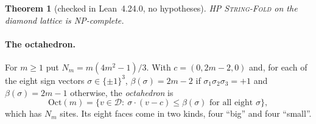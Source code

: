 \documentclass[11pt,letterpaper]{article}
\newtheorem{theorem}{Theorem}
\theoremstyle{definition}
\theoremstyle{remark}
\newcommand{\prob}[1]{\textup{\textsc{#1}}}
\begin{document}
\begin{theorem}[checked in Lean~4.24.0, no hypotheses]\label{thm:diamond}
\prob{HP String-Fold} on the diamond lattice is NP-complete.
\end{theorem}

\paragraph{The octahedron.}
For $m\ge1$ put $N_m=m(4m^2-1)/3$. With $c=(0,2m-2,0)$ and, for each of the eight sign vectors
$\sigma\in\{\pm1\}^3$, $\beta(\sigma)=2m-2$ if $\sigma_1\sigma_2\sigma_3=+1$ and $\beta(\sigma)=2m-1$
otherwise, the \emph{octahedron} is
\[
\mathrm{Oct}(m)=\{v\in\mathcal D:\ \sigma\cdot(v-c)\le\beta(\sigma)\text{ for all eight }\sigma\},
\]
which has $N_m$ sites. Its eight faces come in two kinds, four ``big'' and four ``small''.
\end{document}
